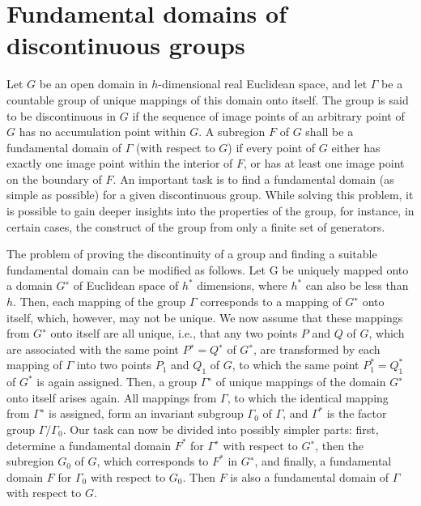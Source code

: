 \documentclass[10pt]{amsart}
\begin{document}
\section{Fundamental domains of discontinuous groups}

Let $G$ be an open domain in $h$-dimensional real Euclidean space, and let $\Gamma$ be a
countable group of unique mappings of this domain onto itself. The group is said
to be discontinuous in $G$ if the sequence of image points of an arbitrary point of $G$
has no accumulation point within $G$. A subregion $F$ of $G$ shall be a fundamental
domain of $\Gamma$ (with respect to $G$) if every point of $G$ either has exactly one image
point within the interior of $F$, or has at least one image point on the boundary
of $F$. An important task is to find a fundamental domain (as simple as possible)
for a given discontinuous group. While solving this problem, it is possible to gain
deeper insights into the properties of the group, for instance, in certain cases, the
construct of the group from only a finite set of generators.

The problem of proving the discontinuity of a group and finding a suitable fundamental
domain can be modified as follows. Let G be uniquely mapped onto a domain $G^∗$ of Euclidean
space of $h^*$ dimensions, where $h^*$ can also be less than $h$.
Then, each mapping of the group $\Gamma$ corresponds to a mapping of $G^∗$ onto itself,
which, however, may not be unique. We now assume that these mappings from
$G^∗$ onto itself are all unique, i.e., that any two points $P$ and $Q$ of $G$, which are
associated with the same point $P^∗ = Q^∗$ of $G^∗$, are transformed by each mapping of
$\Gamma$ into two points $P_1$ and $Q_1$ of $G$, to which the same point $P_1^* = Q_1^*$
of $G^*$ is again assigned. Then, a group $\Gamma^∗$ of unique mappings of the domain
$G^∗$ onto itself arises again. All mappings from $\Gamma$, to which the identical mapping
from $\Gamma^∗$ is assigned, form an invariant subgroup $\Gamma_0$ of $\Gamma$, and $\Gamma^*$
is the factor group $\Gamma / \Gamma_0$. Our task can now be divided into possibly simpler
parts: first, determine a fundamental domain $F^*$ for $\Gamma^∗$ with respect to $G^∗$,
then the subregion $G_0$ of $G$, which corresponds to $F^*$ in $G^∗$, and finally, a
fundamental domain $F$ for $\Gamma_0$ with respect to $G_0$. Then $F$
is also a fundamental domain of $\Gamma$ with respect to $G$.
\end{document}
